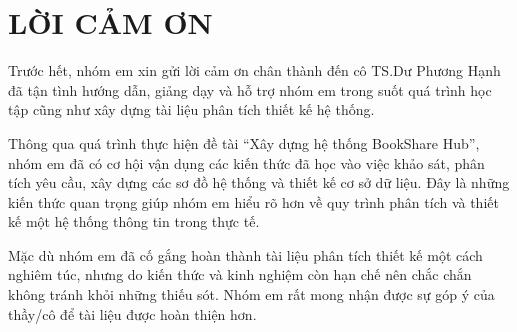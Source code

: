 \documentclass{article}
\begin{document}

\clearpage
\section*{LỜI CẢM ƠN}

Trước hết, nhóm em xin gửi lời cảm ơn chân thành đến cô TS.Dư Phương Hạnh đã tận tình hướng dẫn, giảng dạy và hỗ trợ nhóm em trong suốt quá trình học tập cũng như xây dựng tài liệu phân tích thiết kế hệ thống.

Thông qua quá trình thực hiện đề tài “Xây dựng hệ thống BookShare Hub”, nhóm em đã có cơ hội vận dụng các kiến thức đã học vào việc khảo sát, phân tích yêu cầu, xây dựng các sơ đồ hệ thống và thiết kế cơ sở dữ liệu. Đây là những kiến thức quan trọng giúp nhóm em hiểu rõ hơn về quy trình phân tích và thiết kế một hệ thống thông tin trong thực tế.

Mặc dù nhóm em đã cố gắng hoàn thành tài liệu phân tích thiết kế một cách nghiêm túc, nhưng do kiến thức và kinh nghiệm còn hạn chế nên chắc chắn không tránh khỏi những thiếu sót. Nhóm em rất mong nhận được sự góp ý của thầy/cô để tài liệu được hoàn thiện hơn.
\end{document}
